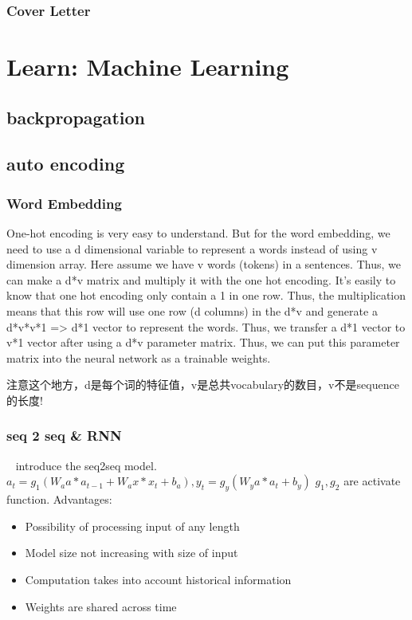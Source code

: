 \documentclass[UTF8]{article}
\begin{document}
\subsubsection{Cover Letter}
\section{Learn: Machine Learning}
\subsection{backpropagation}
\subsection{auto encoding}
\subsubsection{Word Embedding}
One-hot encoding is very easy to understand. But for the word embedding, we need to use a d dimensional variable to represent a words instead of using v dimension array. Here assume we have v words (tokens) in a sentences. Thus, we can make a d*v matrix and multiply it with the one hot encoding. It's easily to know that one hot encoding only contain a 1 in one row. Thus, the multiplication means that this row will use one row (d columns) in the d*v and generate a d*v*v*1 => d*1 vector to represent the words. Thus, we transfer a d*1 vector to v*1 vector after using a d*v parameter matrix. Thus, we can put this parameter matrix into the neural network as a trainable weights.

注意这个地方，d是每个词的特征值，v是总共vocabulary的数目，v不是sequence的长度!
\subsubsection{seq 2 seq \& RNN}
~\cite{sutskever2014sequence} introduce the seq2seq model. 
$a_t = g_1(W_aa*a_{t-1} + W_ax*x_{t} + b_a), y_t = g_y(W_ya*a_{t} + b_y)$ $g_1,g_2$ are activate function. 
Advantages:\\
\begin{itemize}
    \item Possibility of processing input of any length
    \item Model size not increasing with size of input
    \item Computation takes into account historical information
    \item Weights are shared across time
\end{itemize}
\end{document}
